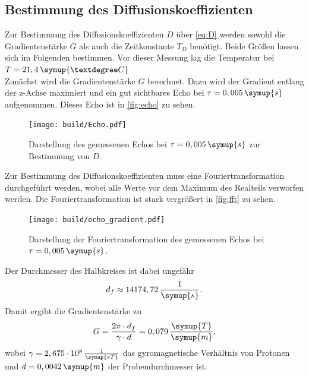 \subsection{Bestimmung des Diffusionskoeffizienten}
Zur Bestimmung des Diffusionskoeffizienten $D$ über \autoref{eq:D} werden sowohl die Gradientenstärke $G$
als auch die Zeitkonstante $T_D$ benötigt. Beide Größen lassen sich im Folgenden bestimmen.
Vor dieser Messung lag die Temperatur bei $T = 21,4 \, \symup{°C}$\\

Zunächst wird die Gradientenstärke $G$ berechnet. Dazu wird der Gradient entlang der z-Achse maximiert und 
ein gut sichtbares Echo bei $\tau = 0,005\, \symup{s}$ aufgenommen. Dieses Echo ist in \autoref{fig:echo}
zu sehen.
\begin{figure}
    \centering
    \texttt{[image: build/Echo.pdf]}
    \caption{Darstellung des gemessenen Echos bei $\tau = 0,005\,\symup{s}$ zur Bestimmung von $D$.}
    \label{fig:echo}
\end{figure}
Zur Bestimmung des Diffusionskoeffizienten muss eine Fouriertransformation durchgeführt werden, wobei 
alle Werte vor dem Maximum des Realteils verworfen werden. Die Fouriertransformation ist stark vergrößert 
in \autoref{fig:fft} zu sehen.
\begin{figure}
    \centering
    \texttt{[image: build/echo\_gradient.pdf]}
    \caption{Darstellung der Fouriertransformation des gemessenen Echos bei $\tau = 0,005\,\symup{s}$.}
    \label{fig:fft}
\end{figure}
Der Durchmesser des Halbkreises ist dabei ungefähr
\begin{equation*}
    d_f \approx 14174,72 \,\frac{1}{\symup{s}}.
\end{equation*}
Damit ergibt die Gradientenstärke zu 
\begin{equation*}
    G = \frac{2 \pi \cdot d_f}{\gamma \cdot d} = 0,079 \, \frac{\symup{T}}{\symup{m}},
\end{equation*}
wobei $\gamma = 2,675 \cdot 10^{8} \, \frac{1}{\symup{s T}}$ das gyromagnetische Verhältnis von Protonen\cite{gamma} und 
$d = 0,0042\,\symup{m}$ der Probendurchmesser ist.\\

